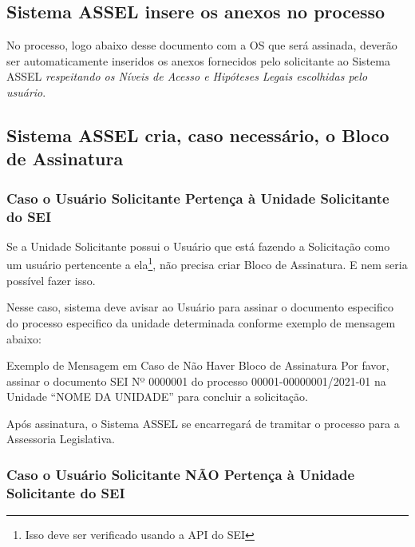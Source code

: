 \subsection{Sistema ASSEL insere os anexos no processo}
		
	No processo, logo abaixo desse documento com a OS que será assinada, deverão ser automaticamente inseridos os anexos fornecidos pelo solicitante ao Sistema ASSEL \emph{respeitando os Níveis de Acesso e Hipóteses Legais escolhidas pelo usuário}. 
		
\subsection{Sistema ASSEL cria, caso necessário, o Bloco de Assinatura}	
	

\subsubsection{Caso o Usuário Solicitante Pertença à Unidade Solicitante do SEI}

	Se a Unidade Solicitante possui o Usuário que está fazendo a Solicitação como um usuário pertencente a ela\footnote{Isso deve ser verificado usando a API do SEI}, não precisa criar Bloco de Assinatura. E nem seria possível fazer isso. 
	
	Nesse caso, sistema deve avisar ao Usuário para assinar o documento especifico do processo especifico da unidade determinada conforme exemplo de mensagem abaixo:
	

	\begin{exemplo}[1]{Exemplo de Mensagem em Caso de Não Haver Bloco de Assinatura}
		Por favor, assinar o documento SEI Nº 0000001 do processo 00001-00000001/2021-01 na Unidade ``NOME DA UNIDADE'' para concluir a solicitação. 
			
		\vphantom{espaço vertical em branco}			
					
		Após assinatura, o Sistema ASSEL se encarregará de tramitar o processo para a Assessoria Legislativa.
		
		\vphantom{espaço vertical em branco}					

	\end{exemplo}
	
	
	
\subsubsection{Caso o Usuário Solicitante NÃO Pertença à Unidade Solicitante do SEI}
	
